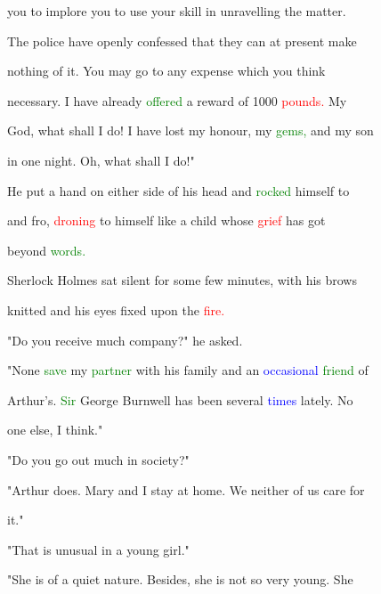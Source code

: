 you to implore you to use your skill in unravelling the matter.

 The \textcolor{BurntOrange}{police} have openly \textcolor{BurntOrange}{confessed} that they can at \textcolor{BurntOrange}{present} make

 nothing of it. You may go to any expense which you think

 necessary. I have already \textcolor{green}{offered} a \textcolor{BurntOrange}{reward} of 1000 \textcolor{red}{pounds.} My

 \textcolor{BurntOrange}{God,} what shall I do! I have \textcolor{BurntOrange}{lost} my honour, my \textcolor{green}{gems,} and my son

 in one night. Oh, what shall I do!"



 He put a hand on either side of his head and \textcolor{green}{rocked} himself to

 and fro, \textcolor{red}{droning} to himself like a \textcolor{BurntOrange}{child} whose \textcolor{red}{grief} has got

 beyond \textcolor{green}{words.}



 Sherlock Holmes sat silent for some few minutes, with his brows

 knitted and his eyes fixed upon the \textcolor{red}{fire.}



 "Do you receive much company?" he asked.



 "None \textcolor{green}{save} my \textcolor{green}{partner} with his family and an \textcolor{blue}{occasional} \textcolor{green}{friend} of

 Arthur's. \textcolor{green}{Sir} George Burnwell has been several \textcolor{blue}{times} lately. No

 one else, I think."



 "Do you go out much in society?"



 "Arthur does. Mary and I stay at home. We neither of us care for

 it."



 "That is unusual in a \textcolor{BurntOrange}{young} girl."



 "She is of a \textcolor{BurntOrange}{quiet} nature. Besides, she is not so very \textcolor{BurntOrange}{young.} She

